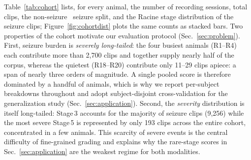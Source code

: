 Table~\ref{tab:cohort} lists, for every animal, the number of recording sessions,
total clips, the non-seizure \vs\ seizure split, and the Racine stage distribution
of the seizure clips; Figure~\ref{fig:cohortdist} plots the same counts as stacked
bars. Two properties of the cohort motivate our evaluation protocol
(Sec.~\ref{sec:problem}). First, seizure burden is \emph{severely long-tailed}: the
four busiest animals (R1--R4) each contribute more than 2{,}700 clips and together
supply nearly half of the corpus, whereas the quietest (R18--R20) contribute only
11--29 clips apiece: a span of nearly three orders of magnitude. A single pooled
score is therefore dominated by a handful of animals, which is why we report
per-subject breakdowns throughout and adopt subject-disjoint cross-validation for
the generalization study (Sec.~\ref{sec:application}). Second, the \emph{severity}
distribution is itself long-tailed: Stage\,3 accounts for the majority of seizure
clips (9{,}256) while the most severe Stage\,5 is represented by only 193 clips
across the entire cohort, concentrated in a few animals. This scarcity of severe
events is the central difficulty of fine-grained grading and explains why the
rare-stage scores in Sec.~\ref{sec:application} are the weakest regime for both
modalities.

